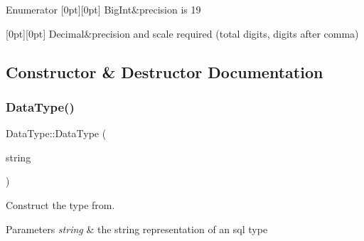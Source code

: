 \begin{DoxyEnumFields}{Enumerator}
[0pt][0pt]{}\mbox{\label{class_data_type_a8df455d8d3949b604fbb2967dfeff239a4c9dd8d283c3f139832ae29d868fd79c}} 
Big\+Int&precision is 19 \\
\hline

[0pt][0pt]{}\mbox{\label{class_data_type_a8df455d8d3949b604fbb2967dfeff239a0e7950ea81022df1b093fd76fc773bcb}} 
Decimal&precision and scale required (total digits, digits after comma) \\
\hline

\end{DoxyEnumFields}


\subsection{Constructor \& Destructor Documentation}
\mbox{\label{class_data_type_aa777acb36257198ce8db6d396fb94bb6}} 
\subsubsection{\texorpdfstring{Data\+Type()}{DataType()}\hspace{0.1cm}{\footnotesize\ttfamily [1/2]}}
{\footnotesize\ttfamily Data\+Type\+::\+Data\+Type (\begin{DoxyParamCaption}\item[{const Q\+String \&}]{string }\end{DoxyParamCaption})}



Construct the type from. 


\begin{DoxyParams}{Parameters}
{\em string} & the string representation of an sql type \\
\hline
\end{DoxyParams}
\mbox{\label{class_data_type_afe0f057e4b0556dd17cbefa59b2487dc}} 
